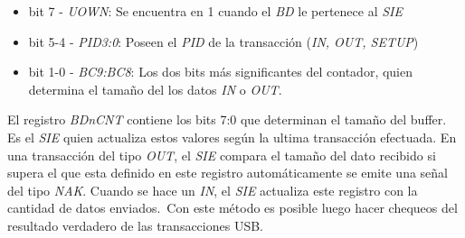 \begin{itemize}
 \item bit 7 - \emph{UOWN}: Se encuentra en 1 cuando el \emph{BD} le pertenece
al \emph{SIE}

 \item bit 5-4 - \emph{PID3:0}: Poseen el \emph{PID} de la transacci\'on
(\emph{IN, OUT, SETUP})

 \item bit 1-0 - \emph{BC9:BC8}: Los dos bits m\'as significantes del
contador, quien determina el tama\~no del los datos \emph{IN} o \emph{OUT}.
\end{itemize}

El registro \emph{BDnCNT} contiene los bits 7:0 que determinan el tama\~no del
buffer. Es el \emph{SIE} quien actualiza estos valores seg\'un la ultima
transacci\'on efectuada. En una transacci\'on del tipo \emph{OUT}, el
\emph{SIE} compara el tama\~no del dato recibido si supera el que esta
definido en este registro autom\'aticamente se emite una se\~nal del tipo
\emph{NAK}. Cuando se hace un \emph{IN}, el \emph{SIE} actualiza este registro
con la cantidad de datos enviados.\
Con este m\'etodo es posible luego hacer chequeos del resultado verdadero de
las transacciones USB. 


